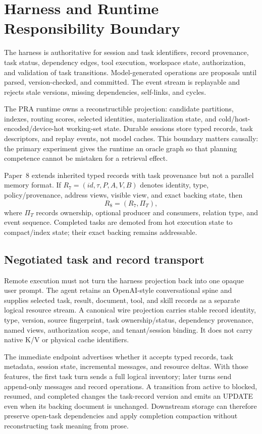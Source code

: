 \documentclass[10pt]{article}
\begin{document}
\section{Harness and Runtime Responsibility Boundary}
The harness is authoritative for session and task identifiers, record provenance, task status, dependency edges, tool execution, workspace state, authorization, and validation of task transitions. Model-generated operations are proposals until parsed, version-checked, and committed. The event stream is replayable and rejects stale versions, missing dependencies, self-links, and cycles.

The PRA runtime owns a reconstructible projection: candidate partitions, indexes, routing scores, selected identities, materialization state, and cold/host-encoded/device-hot working-set state. Durable sessions store typed records, task descriptors, and replay events, not model caches. This boundary matters causally: the primary experiment gives the runtime an oracle graph so that planning competence cannot be mistaken for a retrieval effect.

Paper~8 extends inherited typed records with task provenance but not a parallel memory format. If $R_7=(id,\tau,P,A,V,B)$ denotes identity, type, policy/provenance, address views, visible view, and exact backing state, then
\[
R_8=(R_7,\Pi_T),
\]
where $\Pi_T$ records ownership, optional producer and consumers, relation type, and event sequence. Completed tasks are demoted from hot execution state to compact/index state; their exact backing remains addressable.

\subsection{Negotiated task and record transport}

Remote execution must not turn the harness projection back into one opaque user
prompt. The agent retains an OpenAI-style conversational spine and supplies
selected task, result, document, tool, and skill records as a separate logical
resource stream. A canonical wire projection carries stable record identity,
type, version, source fingerprint, task ownership/status, dependency
provenance, named views, authorization scope, and tenant/session binding. It
does not carry native K/V or physical cache identifiers.

The immediate endpoint advertises whether it accepts typed records, task
metadata, session state, incremental messages, and resource deltas. With those
features, the first task turn sends a full logical inventory; later turns send
append-only messages and record operations. A transition from active to
blocked, resumed, and completed changes the task-record version and emits an
UPDATE even when its backing document is unchanged. Downstream storage can
therefore preserve open-task dependencies and apply completion compaction
without reconstructing task meaning from prose.
\end{document}
